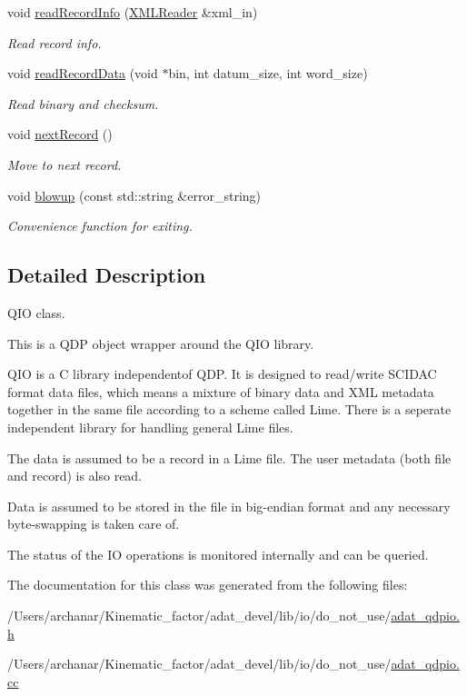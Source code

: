 \begin{DoxyCompactItemize}
void \mbox{\hyperlink{group__qio_ga4d771a46d7db77cd0ae5999113733795}{read\+Record\+Info}} (\mbox{\hyperlink{classADATXML_1_1XMLReader}{X\+M\+L\+Reader}} \&xml\+\_\+in)
\begin{DoxyCompactList}\small\item\em Read record info. \end{DoxyCompactList}\item 
void \mbox{\hyperlink{group__qio_ga525c9902a7ee7ebe41c688897da0652e}{read\+Record\+Data}} (void $\ast$bin, int datum\+\_\+size, int word\+\_\+size)
\begin{DoxyCompactList}\small\item\em Read binary and checksum. \end{DoxyCompactList}\item 
void \mbox{\hyperlink{group__qio_ga032651053fa6b2de6d3977f15862c48e}{next\+Record}} ()
\begin{DoxyCompactList}\small\item\em Move to next record. \end{DoxyCompactList}\item 
void \mbox{\hyperlink{group__qio_gaddf83cb612ce869fe7a0a5f7e559fe72}{blowup}} (const std\+::string \&error\+\_\+string)
\begin{DoxyCompactList}\small\item\em Convenience function for exiting. \end{DoxyCompactList}\end{DoxyCompactItemize}


\subsection{Detailed Description}
Q\+IO class. 

This is a Q\+DP object wrapper around the Q\+IO library.

Q\+IO is a C library independentof Q\+DP. It is designed to read/write S\+C\+I\+D\+AC format data files, which means a mixture of binary data and X\+ML metadata together in the same file according to a scheme called Lime. There is a seperate independent library for handling general Lime files.

The data is assumed to be a record in a Lime file. The user metadata (both file and record) is also read.

Data is assumed to be stored in the file in big-\/endian format and any necessary byte-\/swapping is taken care of.

The status of the IO operations is monitored internally and can be queried. 

The documentation for this class was generated from the following files\+:\begin{DoxyCompactItemize}
\item 
/\+Users/archanar/\+Kinematic\+\_\+factor/adat\+\_\+devel/lib/io/do\+\_\+not\+\_\+use/\mbox{\hyperlink{adat__qdpio_8h}{adat\+\_\+qdpio.\+h}}\item 
/\+Users/archanar/\+Kinematic\+\_\+factor/adat\+\_\+devel/lib/io/do\+\_\+not\+\_\+use/\mbox{\hyperlink{adat__qdpio_8cc}{adat\+\_\+qdpio.\+cc}}\end{DoxyCompactItemize}
